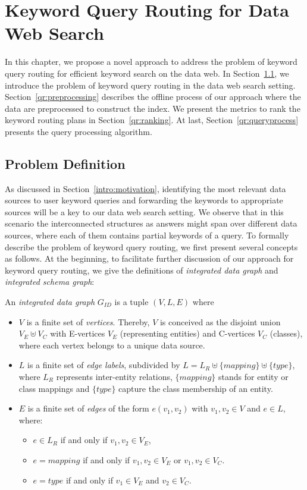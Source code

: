 \chapter{Keyword Query Routing for Data Web Search}\label{qr}

In this chapter, we propose a novel approach to address the problem of keyword query routing for
efficient keyword search on the data web. In Section~\ref{qr:problem}, we introduce the problem of
keyword query routing in the data web search setting. Section~\ref{qr:preprocessing} describes the
offline process of our approach where the data are preprocessed to construct the index. We present
the metrics to rank the keyword routing plans in Section~\ref{qr:ranking}. At last,
Section~\ref{qr:queryprocess} presents the query processing algorithm.

\section{Problem Definition}\label{qr:problem}

As discussed in Section~\ref{intro:motivation}, identifying the most relevant data sources to user
keyword queries and forwarding the keywords to appropriate sources will be a key to our data web
search setting. We observe that in this scenario the interconnected structures as answers might span
over different data sources, where each of them contains partial keywords of a query. To formally
describe the problem of keyword query routing, we first present several concepts as follows. At the
beginning, to facilitate further discussion of our approach for keyword query routing, we give the
definitions of {\em integrated data graph} and {\em integrated schema graph}:
\begin{definition} An \emph{integrated data graph} $G_{ID}$ is a tuple
$(V,L,E)$ where
\begin{itemize}
  \item $V$ is a finite set of \emph{vertices}. Thereby, $V$ is conceived as the disjoint union
  $V_E\uplus V_C$ with E-vertices $V_E$ (representing entities) and C-vertices $V_C$ (classes),
  where each vertex belongs to a unique data source. 
  \item $L$ is a finite set of \emph{edge labels}, subdivided by $L = L_R \uplus \{mapping\} \uplus
  \{type\}$, where $L_R$ represents inter-entity relations, $\{mapping\}$ stands for entity
  or class mappings and $\{type\}$ capture the class membership of an entity.
  \item $E$ is a finite set of \emph{edges} of the form $e(v_1,v_2)$ with $v_1,v_2\in V$ and $e\in
  L$, where:
  \begin{itemize}
    \item $e \in L_R$ if and only if $v_1, v_2 \in V_E$,
    \item $e = \mathit{mapping}$ if and only if $v_1, v_2 \in V_E$ or $v_1, v_2 \in V_C$.
    \item $e = \mathit{type}$ if and only if $v_1 \in V_E$ and $v_2 \in V_C$.  
  \end{itemize}
\end{itemize}
\end{definition}

